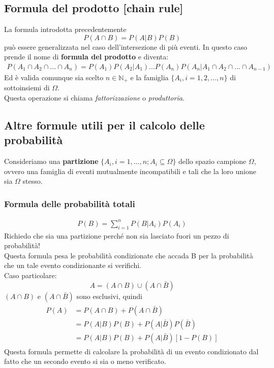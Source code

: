 \subsection{Formula del prodotto [chain rule]}
La formula introdotta precedentemente 
\[
P(A \cap B) = P(A|B) P(B)
\]
può essere generalizzata nel caso dell'intersezione di più eventi. In questo caso prende il nome di \textbf{formula del prodotto} e diventa:
\begin{align}
	P(A_1 \cap A_2 \cap ... \cap A_n ) = P(A_1)P(A_2 | A_1) ... P(A_n)P(A_n | A_1 \cap A_2 \cap ... \cap A_{n-1})
\end{align}
Ed è valida comunque sia scelto $n \in \mathbb{N}_{+}$ e la famiglia $\{A_i, i = 1, 2, ..., n\}$ di sottoinsiemi di $\Omega$. \\
Questa operazione si chiama \textit{fattorizzazione} o \textit{produttoria}.

\subsection{Altre formule utili per il calcolo delle probabilità}
Consideriamo una \textbf{partizione} $\{A_i, i = 1, ..., n; A_i \subseteq \Omega \}$ dello spazio campione $\Omega$, ovvero una famiglia di eventi mutualmente incompatibili e tali che la loro unione sia $\Omega$ stesso.
\subsubsection{Formula delle probabilità totali}
\begin{align}
	P(B) = \sum_{i = 1}^{n} P(B | A_i) P(A_i)
\end{align}
Richiedo che sia una partizione perché non sia lasciato fuori un pezzo di probabilità! \\
Questa formula pesa le probabilità condizionate che accada B per la probabilità che un tale evento condizionante si verifichi.\\
Caso particolare:
\[ A = (A \cap B) \cup (A \cap \bar{B}) \]
$(A \cap B)$ e $(A \cap \bar{B})$ sono esclusivi, quindi
\begin{align}
\begin{split}
	P(A) &= P(A \cap B) + P(A \cap \bar{B}) \\ &= P(A|B) P(B) + P(A|\bar{B}) P(\bar{B}) \\ &= P(A|B) P(B) + P(A|\bar{B}) [1 - P(B)]
\end{split}
\end{align}
Questa formula permette di calcolare la probabilità di un evento condizionato dal fatto che un secondo evento si sia o meno verificato.

